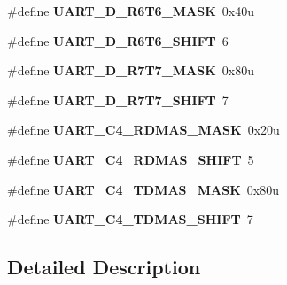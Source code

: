 \begin{DoxyCompactItemize}
\item 
\hypertarget{group___u_a_r_t___register___masks_ga866bfef731e0bc24a2afd8d8131ba93a}{}\#define {\bfseries U\+A\+R\+T\+\_\+\+D\+\_\+\+R6\+T6\+\_\+\+M\+A\+S\+K}~0x40u\label{group___u_a_r_t___register___masks_ga866bfef731e0bc24a2afd8d8131ba93a}

\item 
\hypertarget{group___u_a_r_t___register___masks_ga2437f29b3af453c9abac355cc0f83f17}{}\#define {\bfseries U\+A\+R\+T\+\_\+\+D\+\_\+\+R6\+T6\+\_\+\+S\+H\+I\+F\+T}~6\label{group___u_a_r_t___register___masks_ga2437f29b3af453c9abac355cc0f83f17}

\item 
\hypertarget{group___u_a_r_t___register___masks_ga1f6a350925baddf74b5d3398c52b648f}{}\#define {\bfseries U\+A\+R\+T\+\_\+\+D\+\_\+\+R7\+T7\+\_\+\+M\+A\+S\+K}~0x80u\label{group___u_a_r_t___register___masks_ga1f6a350925baddf74b5d3398c52b648f}

\item 
\hypertarget{group___u_a_r_t___register___masks_gad2b538e10e336537f0adf3c63317bc69}{}\#define {\bfseries U\+A\+R\+T\+\_\+\+D\+\_\+\+R7\+T7\+\_\+\+S\+H\+I\+F\+T}~7\label{group___u_a_r_t___register___masks_gad2b538e10e336537f0adf3c63317bc69}

\item 
\hypertarget{group___u_a_r_t___register___masks_ga51946763b696d9d65cc421b08995923a}{}\#define {\bfseries U\+A\+R\+T\+\_\+\+C4\+\_\+\+R\+D\+M\+A\+S\+\_\+\+M\+A\+S\+K}~0x20u\label{group___u_a_r_t___register___masks_ga51946763b696d9d65cc421b08995923a}

\item 
\hypertarget{group___u_a_r_t___register___masks_ga4c44b0d9f3315d9fad52f1c2b9e2d347}{}\#define {\bfseries U\+A\+R\+T\+\_\+\+C4\+\_\+\+R\+D\+M\+A\+S\+\_\+\+S\+H\+I\+F\+T}~5\label{group___u_a_r_t___register___masks_ga4c44b0d9f3315d9fad52f1c2b9e2d347}

\item 
\hypertarget{group___u_a_r_t___register___masks_gaddd38f2fce38e0a363744ab50071c471}{}\#define {\bfseries U\+A\+R\+T\+\_\+\+C4\+\_\+\+T\+D\+M\+A\+S\+\_\+\+M\+A\+S\+K}~0x80u\label{group___u_a_r_t___register___masks_gaddd38f2fce38e0a363744ab50071c471}

\item 
\hypertarget{group___u_a_r_t___register___masks_ga60d9c5b3d3d01f52b013c8d22363ff24}{}\#define {\bfseries U\+A\+R\+T\+\_\+\+C4\+\_\+\+T\+D\+M\+A\+S\+\_\+\+S\+H\+I\+F\+T}~7\label{group___u_a_r_t___register___masks_ga60d9c5b3d3d01f52b013c8d22363ff24}

\end{DoxyCompactItemize}


\subsection{Detailed Description}
